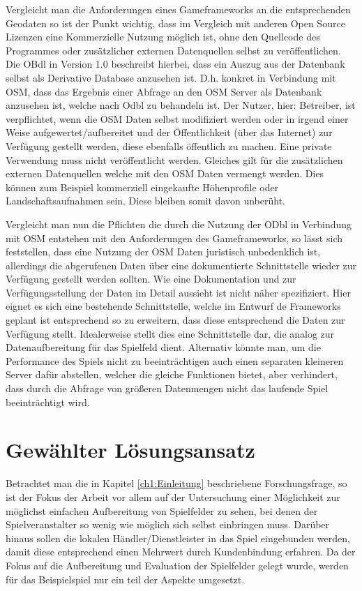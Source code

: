 Vergleicht man die Anforderungen eines Gameframeworks an die entsprechenden Geodaten so ist der Punkt wichtig, dass im Vergleich mit anderen Open Source Lizenzen eine Kommerzielle Nutzung möglich ist, ohne den Quellcode des Programmes oder zusätzlicher externen Datenquellen selbst zu veröffentlichen.
Die OBdl in Version 1.0 \cite{Odbl.2014} beschreibt hierbei, dass ein Auszug aus der Datenbank selbst als Derivative Database anzusehen ist. D.h. konkret in Verbindung mit OSM, dass das Ergebnis einer Abfrage an den OSM Server als Datenbank anzusehen ist, welche nach Odbl zu behandeln ist. Der Nutzer, hier: Betreiber, ist verpflichtet, wenn die OSM Daten selbst modifiziert werden oder in irgend einer Weise aufgewertet/aufbereitet und der Öffentlichkeit (über das Internet) zur Verfügung gestellt werden, diese ebenfalls öffentlich zu machen. Eine private Verwendung muss nicht veröffentlicht werden. Gleiches gilt für die zusätzlichen externen Datenquellen welche mit den OSM Daten vermengt werden. Dies können zum Beispiel kommerziell eingekaufte Höhenprofile oder Landschaftsaufnahmen sein. Diese bleiben somit davon unberüht.

Vergleicht man nun die Pflichten die durch die Nutzung der ODbl in Verbindung mit OSM entstehen mit den Anforderungen des Gameframeworks, so lässt sich feststellen, dass eine Nutzung der OSM Daten juristisch unbedenklich ist, allerdings die abgerufenen Daten über eine dokumentierte Schnittstelle wieder zur Verfügung gestellt werden sollten.
Wie eine Dokumentation und zur Verfügungsstellung der Daten im Detail aussieht ist nicht näher spezifiziert. Hier eignet es sich eine bestehende Schnittstelle, welche im Entwurf de Frameworks geplant ist entsprechend so zu erweitern, dass diese entsprechend die Daten zur Verfügung stellt. Idealerweise stellt dies eine Schnittstelle dar, die analog zur Datenaufbereitung für das Spielfeld dient. Alternativ könnte man, um die Performance des Spiels nicht zu beeinträchtigen auch einen separaten kleineren Server dafür abstellen, welcher die gleiche Funktionen bietet, aber verhindert, dass durch die Abfrage von größeren Datenmengen nicht das laufende Spiel beeinträchtigt wird.

\section{Gewählter Lösungsansatz}
\label{ch4:s:choosen_solution}

Betrachtet man die in Kapitel \ref{ch1:Einleitung} beschriebene Forschungsfrage, so ist der Fokus der Arbeit vor allem auf der Untersuchung einer Möglichkeit zur möglichst einfachen Aufbereitung von Spielfelder zu sehen, bei denen der Spielveranstalter so wenig wie möglich sich selbst einbringen muss. Darüber hinaus sollen die lokalen Händler/Dienstleister in das Spiel eingebunden werden, damit diese entsprechend einen Mehrwert durch Kundenbindung erfahren.
Da der Fokus auf die Aufbereitung und Evaluation der Spielfelder gelegt wurde, werden für das Beispielspiel nur ein teil der Aspekte umgesetzt.

